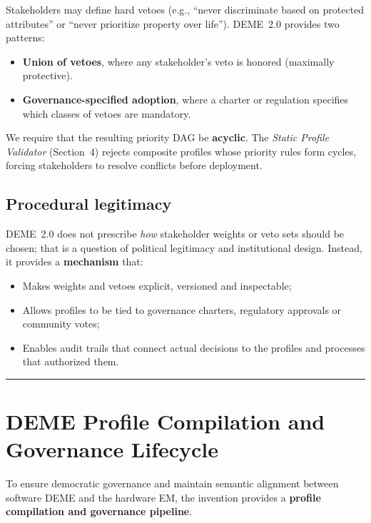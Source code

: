 \documentclass[11pt]{article}
\begin{document}
Stakeholders may define hard vetoes (e.g., ``never discriminate based on protected attributes'' or ``never prioritize property over life''). DEME~2.0 provides two patterns:

\begin{itemize}
  \item \textbf{Union of vetoes}, where any stakeholder's veto is honored (maximally protective).
  \item \textbf{Governance-specified adoption}, where a charter or regulation specifies which classes of vetoes are mandatory.
\end{itemize}

We require that the resulting priority DAG be \textbf{acyclic}. The \emph{Static Profile Validator} (Section~4) rejects composite profiles whose priority rules form cycles, forcing stakeholders to resolve conflicts before deployment.

\subsection{Procedural legitimacy}

DEME~2.0 does not prescribe \emph{how} stakeholder weights or veto sets should be chosen; that is a question of political legitimacy and institutional design. Instead, it provides a \textbf{mechanism} that:

\begin{itemize}
  \item Makes weights and vetoes explicit, versioned and inspectable;
  \item Allows profiles to be tied to governance charters, regulatory approvals or community votes;
  \item Enables audit trails that connect actual decisions to the profiles and processes that authorized them.
\end{itemize}

\hrule
\vspace{1em}

\section{DEME Profile Compilation and Governance Lifecycle}

To ensure democratic governance and maintain semantic alignment between software DEME and the hardware EM, the invention provides a \textbf{profile compilation and governance pipeline}.
\end{document}
